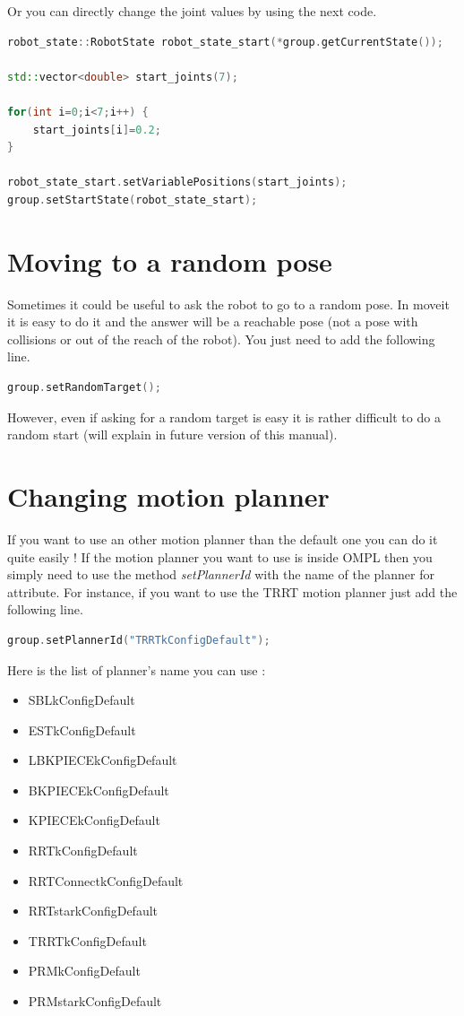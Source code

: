 Or you can directly change the joint values by using the next code.


\begin{lstlisting}[language=c++]
robot_state::RobotState robot_state_start(*group.getCurrentState());
    
std::vector<double> start_joints(7);

for(int i=0;i<7;i++) {
	start_joints[i]=0.2;
}
      
robot_state_start.setVariablePositions(start_joints);
group.setStartState(robot_state_start);
\end{lstlisting}




\section{Moving to a random pose}

Sometimes it could be useful to ask the robot to go to a random pose. In moveit it is easy to do it and the answer will be a reachable pose (not a pose with collisions or out of the reach of the robot). You just need to add the following line.

\begin{lstlisting}[language=c++]
group.setRandomTarget();
\end{lstlisting}

However, even if asking for a random target is easy it is rather difficult to do a random start (will explain in future version of this manual).

\section{Changing motion planner}

If you want to use an other motion planner than the default one you can do it quite easily ! If the motion planner you want to use is inside OMPL then you simply need to use the method \emph{setPlannerId} with the name of the planner for attribute. For instance, if you want to use the TRRT motion planner just add the following line.


\begin{lstlisting}[language=c++]
group.setPlannerId("TRRTkConfigDefault");
\end{lstlisting}

Here is the list of planner's name you can use :
\begin{itemize}
\item SBLkConfigDefault
\item ESTkConfigDefault
\item LBKPIECEkConfigDefault
\item BKPIECEkConfigDefault
\item KPIECEkConfigDefault
\item RRTkConfigDefault
\item RRTConnectkConfigDefault
\item RRTstarkConfigDefault
\item TRRTkConfigDefault
\item PRMkConfigDefault
\item PRMstarkConfigDefault
\end{itemize}

